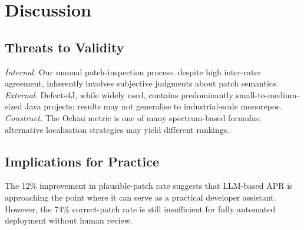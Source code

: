 \section{Discussion}

\subsection{Threats to Validity}

\textit{Internal.} Our manual patch-inspection process, despite high
inter-rater agreement, inherently involves subjective judgments about
patch semantics. \textit{External.} Defects4J, while widely used, contains
predominantly small-to-medium-sized Java projects; results may not
generalise to industrial-scale monorepos. \textit{Construct.} The Ochiai
metric is one of many spectrum-based formulas; alternative localisation
strategies may yield different rankings.

\subsection{Implications for Practice}

The 12\% improvement in plausible-patch rate suggests that LLM-based APR
is approaching the point where it can serve as a practical developer
assistant. However, the 74\% correct-patch rate is still insufficient
for fully automated deployment without human review.

